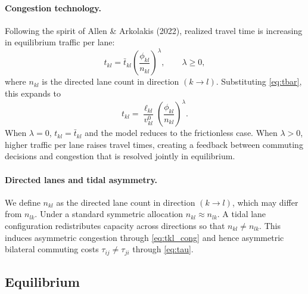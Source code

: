 \documentclass[12pt]{article}
\begin{document}
	\paragraph{Congestion technology.}
	Following the spirit of Allen \& Arkolakis (2022), realized travel time is increasing in equilibrium traffic per lane:
	\begin{equation}
		t_{kl}
		=
		\bar{t}_{kl}
		\left(
		\frac{\phi_{kl}}{n_{kl}}
		\right)^{\!\lambda},
		\qquad \lambda \geq 0,
		\label{eq:tkl_cong}
	\end{equation}
	where $n_{kl}$ is the directed lane count in direction $(k\to l)$. Substituting \eqref{eq:tbar}, this expands to
	\begin{equation}
		t_{kl}
		=
		\frac{\ell_{kl}}{v^0_{kl}}
		\left(
		\frac{\phi_{kl}}{n_{kl}}
		\right)^{\!\lambda}.
		\label{eq:tkl_expand}
	\end{equation}
	When $\lambda=0$, $t_{kl}=\bar{t}_{kl}$ and the model reduces to the frictionless case. When $\lambda>0$, higher traffic per lane raises travel times, creating a feedback between commuting decisions and congestion that is resolved jointly in equilibrium.

	\paragraph{Directed lanes and tidal asymmetry.}
	We define $n_{kl}$ as the directed lane count in direction $(k\to l)$, which may differ from $n_{lk}$. Under a standard symmetric allocation $n_{kl}\approx n_{lk}$. A tidal lane configuration redistributes capacity across directions so that $n_{kl}\neq n_{lk}$. This induces asymmetric congestion through \eqref{eq:tkl_cong} and hence asymmetric bilateral commuting costs $\tau_{ij}\neq\tau_{ji}$ through \eqref{eq:tau}.
	
	\subsection{Equilibrium}
\end{document}
